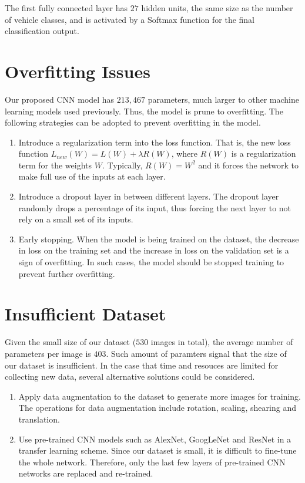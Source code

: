 The first fully connected layer has $27$ hidden units, the same size as the number of vehicle classes, and is activated by a Softmax function for the final classification output.


\section{Overfitting Issues}
Our proposed CNN model has $213,467$ parameters, much larger to other machine learning models used previously. Thus, the model is prune to overfitting.
The following strategies can be adopted to prevent overfitting in the model.

\begin{enumerate}
\item
	Introduce a regularization term into the loss function. That is, the new loss function $L_{new}(W) = L(W) + \lambda R(W)$, where $R(W)$ is a regularization term for the weights $W$. Typically, $R(W) = W^2$ and it forces the network to make full use of the inputs at each layer.
\item
	Introduce a dropout layer in between different layers. The dropout layer randomly drops a percentage of its input, thus forcing the next layer to not rely on a small set of its inputs.
\item
	Early stopping. When the model is being trained on the dataset, the decrease in loss on the training set and the increase in loss on the validation set is a sign of overfitting. In such cases, the model should be stopped training to prevent further overfitting.
\end{enumerate}

\section{Insufficient Dataset}
Given the small size of our dataset ($530$ images in total), the average number of parameters per image is $403$. 
Such amount of paramters signal that the size of our dataset is insufficient.
In the case that time and resouces are limited for collecting new data, several alternative solutions could be considered.

\begin{enumerate}
\item
	Apply data augmentation to the dataset to generate more images for training. The operations for data augmentation include rotation, scaling, shearing and translation.
\item
	Use pre-trained CNN models such as AlexNet\citep{krizhevsky2012imagenet}, GoogLeNet\cite{szegedy2015going} and ResNet\citep{he2016deep} in a transfer learning scheme. Since our dataset is small, it is difficult to fine-tune the whole network. Therefore, only the last few layers of pre-trained CNN networks are replaced and re-trained.
\end{enumerate}








